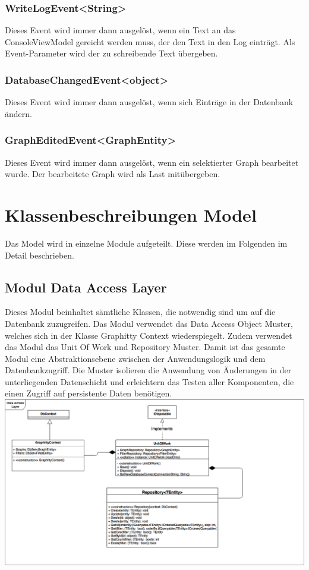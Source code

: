 \documentclass[13pt]{scrreprt}
\begin{document}
	\subsection{WriteLogEvent<String>}
	Dieses Event wird immer dann ausgel\"ost, wenn ein Text an das ConsoleViewModel gereicht werden muss, der den Text in den Log eintr\"agt. Als Event-Parameter wird der zu schreibende Text \"ubergeben.
	\subsection{DatabaseChangedEvent<object>}
	Dieses Event wird immer dann ausgel\"ost, wenn sich Eintr\"age in der Datenbank \"andern.
	\subsection{GraphEditedEvent<GraphEntity>}
	Dieses Event wird immer dann ausgel\"ost, wenn ein selektierter Graph bearbeitet wurde. Der bearbeitete Graph wird als Last mit\"ubergeben.
	
	\chapter{Klassenbeschreibungen Model}
	Das Model wird in einzelne Module aufgeteilt. Diese werden im Folgenden im Detail beschrieben.
	
	\section{Modul Data Access Layer}
	Dieses Modul beinhaltet s\"amtliche Klassen, die notwendig sind um auf die Datenbank zuzugreifen. Das Modul verwendet das Data Access Object Muster, welches sich in der Klasse Graphitty Context wiederspiegelt. Zudem verwendet das Modul das Unit Of Work und Repository Muster. Damit ist das gesamte Modul eine Abstraktionsebene zwischen der Anwendungslogik und dem Datenbankzugriff. Die Muster isolieren die Anwendung von \"Anderungen in der unterliegenden Datenschicht und erleichtern das Testen aller Komponenten, die einen Zugriff auf persistente Daten ben\"otigen.
	\newline
	\includegraphics[scale=0.4, center]{DataAccessLayer.png}
\end{document}
